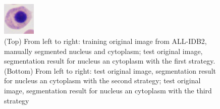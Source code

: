 \documentclass[final,a4paper,12pt,english]{UnicaPhdThesis3}
\begin{document}
\begin{figure}[h]
	\includegraphics[width=0.14\textwidth]{images/2016_2_sitis/nucleated}\hspace{-1mm}
	\caption{\label{fig:RBCs} (Top) From left to right: training original image from ALL-IDB2, manually segmented nucleus and cytoplasm; test original image, segmentation result for nucleus an cytoplasm with the first strategy. (Bottom) From left to right: test original image, segmentation result for nucleus an cytoplasm with the second strategy; test original image, segmentation result for nucleus an cytoplasm with the third strategy}
\end{figure}
\end{document}
